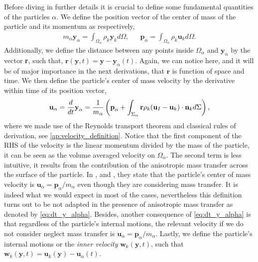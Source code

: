 Before diving in further details it is crucial to define some fundamental quantities of the particles $\alpha$.
We define the position vector of the center of mass of the particle and its momentum as respectively,
\begin{align}
    m_\alpha \textbf{y}_\alpha
    = \int_{\Omega_\alpha} \rho_k \textbf{y}_k d\Omega,
    &&
    \textbf{p}_\alpha 
    = \int_{\Omega_\alpha} \rho_k \textbf{u}_k d\Omega.
    \label{eq:position_and_momentum_def}
\end{align}
Additionally, we define the distance between any points inside $\Omega_\alpha$ and $\textbf{y}_\alpha$ by the vector \textbf{r}, such that, $\textbf{r}(\textbf{y},t) = \textbf{y} - \textbf{y}_\alpha(t)$.
Again, we can notice here, and it will be of major importance in the next derivations, that $\textbf{r}$ is function of space and time.
We then define the particle's center of mass velocity by the derivative within time of its position vector,
\begin{equation}
    \textbf{u}_\alpha = \frac{d}{d t} \textbf{y}_\alpha
    = \frac{1}{m_\alpha} \left(
        \textbf{p}_\alpha
        +  \int_{\Sigma_\alpha} \textbf{r} \rho_k (\textbf{u}_I - \textbf{u}_k)\cdot \textbf{n}_k d\Sigma
        \right),
        \label{eq:dt_y_alpha}
\end{equation}
where we made use of the Reynolds transport theorem and classical rules of derivation, see \ref{ap:velocity_definition}.
Notice that the first component of the RHS of the velocity is the linear momentum divided by the mass of the particle, it can be seen as the volume averaged velocity on $\Omega_\alpha$.
The second term is less intuitive, it results from the contribution of the anisotropic mass transfer across the surface of the particle.
In \citet{zaepffel2011modelisation}, \citet{paisant2014modelisation} and \citet{morel2015mathematical}, they state that the particle's center of mass velocity is $\textbf{u}_\alpha = \textbf{p}_\alpha / m_\alpha$ even though they are considering mass transfer.
It is indeed what we would expect in most of the cases, nevertheless this definition turns out to be not adapted in the presence of anisotropic mass transfer as denoted by \ref{eq:dt_y_alpha}.
Besides, another consequence of \ref{eq:dt_y_alpha} is that regardless of the particle's internal motions, the relevant velocity if we do not consider neglect mass transfer is $\textbf{u}_\alpha = \textbf{p}_\alpha / m_\alpha$.
Lastly, we define the particle's internal motions or the \textit{inner velocity} $\textbf{w}_k(\textbf{y},t)$, such that $\textbf{w}_k(\textbf{y},t) = \textbf{u}_k(\textbf{y}) - \textbf{u}_\alpha(t)$.
